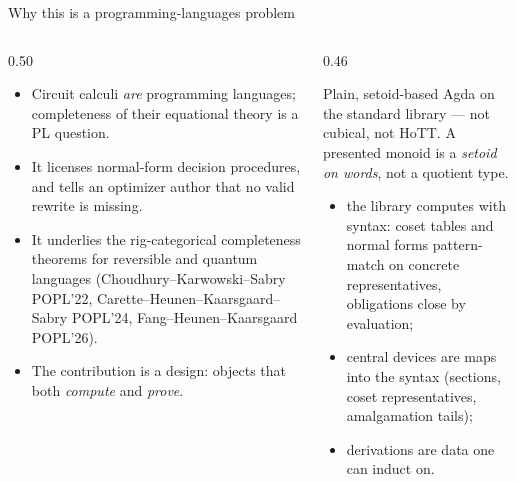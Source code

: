 \begin{frame}{Why this is a programming-languages problem \InPaper}
\begin{columns}[T]
\begin{column}{0.50\textwidth}
\begin{itemize}
  \setlength{\itemsep}{5pt}
  \item Circuit calculi \emph{are} programming languages; completeness of
        their equational theory is a PL question.
  \item It licenses \alert{normal-form decision procedures}, and tells an
        optimizer author that \alert{no valid rewrite is missing}.
  \item It underlies the rig-categorical completeness theorems for
        reversible and quantum languages (Choudhury--Karwowski--Sabry POPL'22,
        Carette--Heunen--Kaarsgaard--Sabry POPL'24, Fang--Heunen--Kaarsgaard
        POPL'26).
  \item The contribution is a \alert{design}: objects that both
        \emph{compute} and \emph{prove}.
\end{itemize}
\end{column}
\begin{column}{0.46\textwidth}
\begin{keybox}[title={Announced up front: setoids, not quotients}]
\small
Plain, setoid-based Agda on the standard library --- not cubical, not HoTT.
A presented monoid is a \emph{setoid on words}, not a quotient type.
\begin{itemize}
  \item the library \alert{computes with syntax}: coset tables and normal
        forms pattern-match on concrete representatives, obligations close
        by evaluation;
  \item central devices are maps \alert{into} the syntax (sections, coset
        representatives, amalgamation tails);
  \item derivations are \alert{data} one can induct on.
\end{itemize}
\end{keybox}
\end{column}
\end{columns}
\end{frame}

